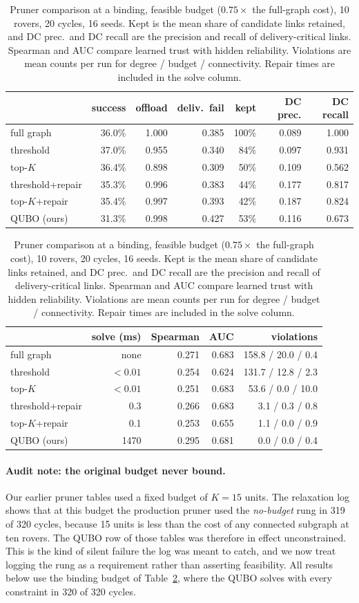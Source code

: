 \documentclass[11pt]{article}
\begin{document}
\begin{table}[t]
\centering
\caption{Pruner comparison at a binding, feasible budget ($0.75\times$ the
full-graph cost), 10 rovers, 20 cycles, 16 seeds. Kept is the mean share of
candidate links retained, and DC prec.\ and DC recall are the precision and
recall of delivery-critical links. Spearman and AUC compare learned trust with
hidden reliability. Violations are mean counts per run for degree / budget /
connectivity. Repair times are included in the solve column.}
\label{tab:pruners}
\small
\setlength{\tabcolsep}{4pt}
\begin{tabular}{@{}lrrrrrr@{}}
\toprule
 & success & offload & deliv.\ fail & kept & DC prec. & DC recall \\
\midrule
full graph & 36.0\% & 1.000 & 0.385 & 100\% & 0.089 & 1.000 \\
threshold & 37.0\% & 0.955 & 0.340 & 84\% & 0.097 & 0.931 \\
top-$K$ & 36.4\% & 0.898 & 0.309 & 50\% & 0.109 & 0.562 \\
threshold+repair & 35.3\% & 0.996 & 0.383 & 44\% & 0.177 & 0.817 \\
top-$K$+repair & 35.4\% & 0.997 & 0.393 & 42\% & 0.187 & 0.824 \\
QUBO (ours) & 31.3\% & 0.998 & 0.427 & 53\% & 0.116 & 0.673 \\
\bottomrule
\end{tabular}

\vspace{4pt}
\begin{tabular}{@{}lrrrr@{}}
\toprule
 & solve (ms) & Spearman & AUC & violations \\
\midrule
full graph & none & 0.271 & 0.683 & 158.8 / 20.0 / 0.4 \\
threshold & $<0.01$ & 0.254 & 0.624 & 131.7 / 12.8 / 2.3 \\
top-$K$ & $<0.01$ & 0.251 & 0.683 & 53.6 / 0.0 / 10.0 \\
threshold+repair & 0.3 & 0.266 & 0.683 & 3.1 / 0.3 / 0.8 \\
top-$K$+repair & 0.1 & 0.253 & 0.655 & 1.1 / 0.0 / 0.9 \\
QUBO (ours) & 1470 & 0.295 & 0.681 & 0.0 / 0.0 / 0.4 \\
\bottomrule
\end{tabular}
\end{table}

\paragraph{Audit note: the original budget never bound.}
Our earlier pruner tables used a fixed budget of $K=15$ units. The relaxation
log shows that at this budget the production pruner used the \emph{no-budget}
rung in 319 of 320 cycles, because 15 units is less than the cost of any
connected subgraph at ten rovers. The QUBO row of those tables was therefore
in effect unconstrained. This is the kind of silent failure the log was meant
to catch, and we now treat logging the rung as a requirement rather than
asserting feasibility. All results below use the binding budget of
Table~\ref{tab:pruners}, where the QUBO solves with every constraint in 320
of 320 cycles.
\end{document}
